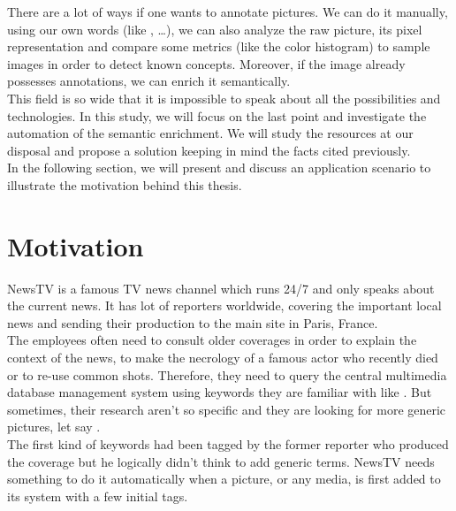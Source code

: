 There are a lot of ways if one wants to annotate pictures. We can do it manually, using our own words (like ,  \dots), we can also analyze the raw picture, its pixel representation and compare some metrics (like the color histogram) to sample images in order to detect known concepts. Moreover, if the image already possesses annotations, we can enrich it semantically. \\

This field is so wide that it is impossible to speak about all the possibilities and technologies. In this study, we will focus on the last point and investigate the automation of the semantic enrichment. We will study the resources at our disposal and propose a solution keeping in mind the facts cited previously.\\

In the following section, we will present and discuss an application scenario to illustrate the motivation behind this thesis. 


\section{Motivation}

NewsTV is a famous TV news channel which runs 24/7 and only speaks about the current news. It has lot of reporters worldwide, covering the important local news and sending their production to the main site in Paris, France.\\

The employees often need to consult older coverages in order to explain the context of the news, to make the necrology of a famous actor who recently died or to re-use common shots. 
Therefore, they need to query the central multimedia database management system using keywords they are familiar with like . But sometimes, their research aren't so specific and they are looking for more generic pictures, let say .\\

The first kind of keywords had been tagged by the former reporter who produced the coverage but he logically didn't think to add generic terms. NewsTV needs something to do it automatically when a picture, or any media, is first added to its system with a few initial tags.\\

